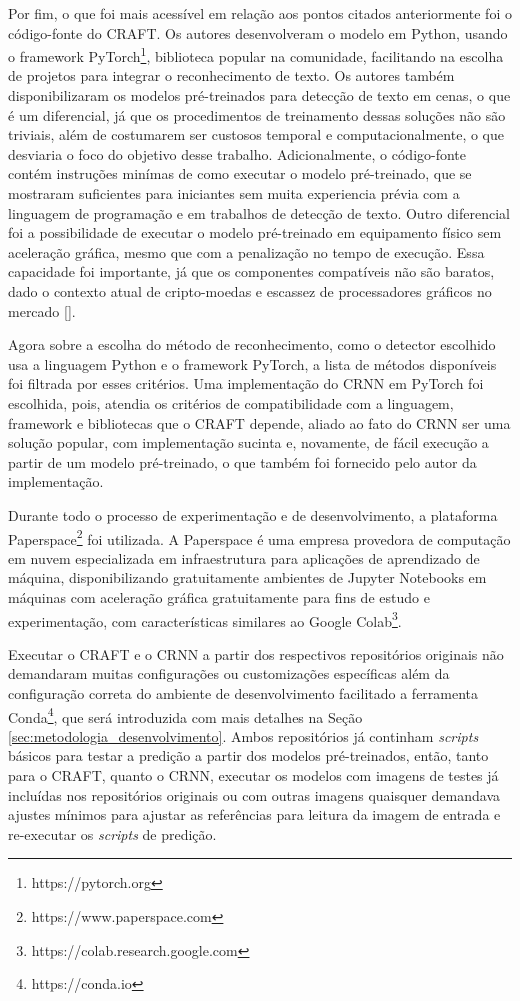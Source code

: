 Por fim, o que foi mais acessível em relação aos pontos citados anteriormente foi o código-fonte do CRAFT. Os autores desenvolveram o modelo em 
Python, usando o framework PyTorch\footnote{https://pytorch.org}, biblioteca popular na comunidade, facilitando na escolha de projetos para 
integrar o reconhecimento de texto. Os autores também disponibilizaram os modelos pré-treinados para detecção de texto em cenas, o que é um diferencial, 
já que os procedimentos de treinamento dessas soluções não são triviais, além de costumarem ser custosos temporal e computacionalmente, o que desviaria o foco do objetivo desse trabalho. 
Adicionalmente, o código-fonte contém instruções minímas de como executar o modelo pré-treinado, que se mostraram suficientes para iniciantes 
sem muita experiencia prévia com a linguagem de programação e em trabalhos de detecção de texto. Outro diferencial foi a possibilidade de executar 
o modelo pré-treinado em equipamento físico sem aceleração gráfica, mesmo que com a penalização no tempo de execução. 
Essa capacidade foi importante, já que os componentes compatíveis não são baratos, dado o contexto atual de cripto-moedas e escassez de processadores gráficos no mercado [].

Agora sobre a escolha do método de reconhecimento, como o detector escolhido usa a linguagem Python e o framework PyTorch, a lista de métodos 
disponíveis foi filtrada por esses critérios. Uma implementação do CRNN em PyTorch foi escolhida, pois, atendia os critérios de compatibilidade 
com a linguagem, framework e bibliotecas que o CRAFT depende, aliado ao fato do CRNN ser uma solução popular, com implementação sucinta e, 
novamente, de fácil execução a partir de um modelo pré-treinado, o que também foi fornecido pelo autor da implementação.

Durante todo o processo de experimentação e de desenvolvimento, a plataforma Paperspace\footnote{https://www.paperspace.com} foi utilizada. 
A Paperspace é uma empresa provedora de computação em nuvem especializada em infraestrutura para aplicações de aprendizado de máquina, disponibilizando 
gratuitamente ambientes de Jupyter Notebooks em máquinas com aceleração gráfica gratuitamente para fins de estudo e experimentação, com características 
similares ao Google Colab\footnote{https://colab.research.google.com}.

Executar o CRAFT e o CRNN a partir dos respectivos repositórios originais não demandaram muitas configurações ou customizações específicas além da 
configuração correta do ambiente de desenvolvimento facilitado a ferramenta Conda\footnote{https://conda.io}, que será introduzida com mais detalhes na Seção \ref{sec:metodologia_desenvolvimento}.
Ambos repositórios já continham \textit{scripts} básicos para testar a predição a partir dos modelos pré-treinados, então, tanto para o CRAFT, 
quanto o CRNN, executar os modelos com imagens de testes já incluídas nos repositórios originais ou com outras imagens quaisquer demandava ajustes 
mínimos para ajustar as referências para leitura da imagem de entrada e re-executar os \textit{scripts} de predição.

